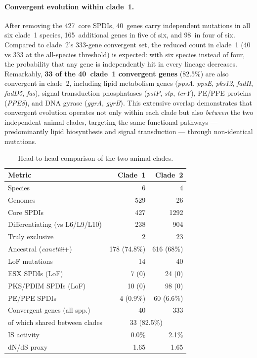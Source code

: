 \documentclass[11pt,a4paper]{article}
\begin{document}
\paragraph{Convergent evolution within clade~1.}
After removing the 427~core SPDIs, 40~genes carry independent mutations in
all six clade~1 species, 165~additional genes in five of six, and
98~in four of six.
%
Compared to clade~2's 333-gene convergent set, the reduced count in
clade~1 (40 vs 333 at the all-species threshold) is expected: with six
species instead of four, the probability that any gene is independently
hit in every lineage decreases.
%
Remarkably, \textbf{33 of the 40~clade~1 convergent genes} (82.5\%) are
also convergent in clade~2, including lipid metabolism genes
(\textit{ppsA}, \textit{ppsE}, \textit{pks12}, \textit{fadH}, \textit{fadD5},
\textit{fas}), signal transduction phosphatases (\textit{pstP}, \textit{stp},
\textit{tcrY}), PE/PPE proteins (\textit{PPE8}), and DNA gyrase
(\textit{gyrA}, \textit{gyrB}).
%
This extensive overlap demonstrates that convergent evolution operates not
only within each clade but also \emph{between} the two independent animal
clades, targeting the same functional pathways ---
predominantly lipid biosynthesis and signal transduction ---
through non-identical mutations.

\begin{table}[h]
\centering
\caption{Head-to-head comparison of the two animal clades.}
\label{tab:c1_vs_c2}
\begin{tabular}{@{}lrr@{}}
\toprule
Metric & \textbf{Clade~1} & \textbf{Clade~2} \\
\midrule
Species & 6 & 4 \\
Genomes & 529 & 26 \\
Core SPDIs & 427 & \num{1292} \\
Differentiating (vs L6/L9/L10) & 238 & 904 \\
Truly exclusive & 2 & 23 \\
Ancestral (\textit{canettii}+) & 178 (74.8\%) & 616 (68\%) \\
LoF mutations & 14 & 40 \\
ESX SPDIs (LoF) & 7 (0) & 24 (0) \\
PKS/PDIM SPDIs (LoF) & 10 (0) & 98 (0) \\
PE/PPE SPDIs & 4 (0.9\%) & 60 (6.6\%) \\
Convergent genes (all spp.) & 40 & 333 \\
\quad of which shared between clades & \multicolumn{2}{c}{33 (82.5\%)} \\
IS activity & 0.0\% & 2.1\% \\
dN/dS proxy & 1.65 & 1.65 \\
\bottomrule
\end{tabular}
\end{table}
\end{document}
